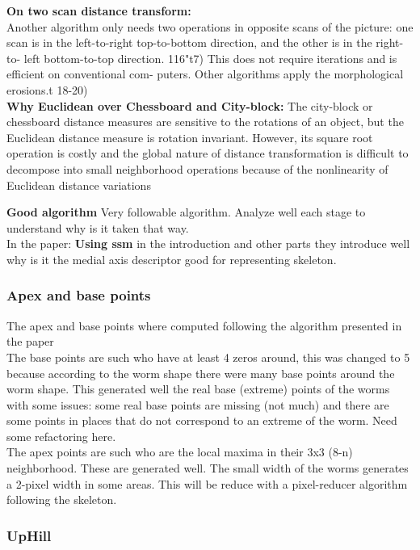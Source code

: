 \documentclass{article}
\begin{document}
\textbf{On two scan distance transform: }\\

Another algorithm only needs two operations in opposite scans
of the picture: one scan is in the left-to-right top-to-bottom
direction, and the other is in the right-to-
left bottom-to-top direction. 116"t7) This does not
require iterations and is efficient on conventional com-
puters. Other algorithms apply the morphological
erosions.t 18-20)\\

\textbf{Why Euclidean over Chessboard and City-block: }
The city-block or chessboard distance measures are
sensitive to the rotations of an object, but the Euclidean
distance measure is rotation invariant. However, its
square root operation is costly and the global nature
of distance transformation is difficult to decompose
into small neighborhood operations because of the
nonlinearity of Euclidean distance variations

\textbf{Good algorithm}
Very followable algorithm. Analyze well each stage to understand why is it
taken that way.\\

In the paper: \textbf{Using ssm} in the introduction and other parts they
introduce well why is it the medial axis descriptor good for representing
skeleton.\\

\subsubsection{Apex and base points}
The apex and base points where computed following the algorithm presented in the paper\\
The base points are such who have at least 4 zeros around, this was changed to 5 because
according to the worm shape there were many base points around the worm shape.
This generated well the real base (extreme) points of the worms with some issues: some
real base points are missing (not much) and there are some points in places that do not
correspond to an extreme of the worm. Need some refactoring here.
\\

The apex points are such who are the local maxima in their 3x3 (8-n) neighborhood. 
These are generated well. The small width of the worms generates a 2-pixel width
in some areas. This will be reduce with a pixel-reducer algorithm following the skeleton.

\subsubsection{UpHill}
\end{document}
